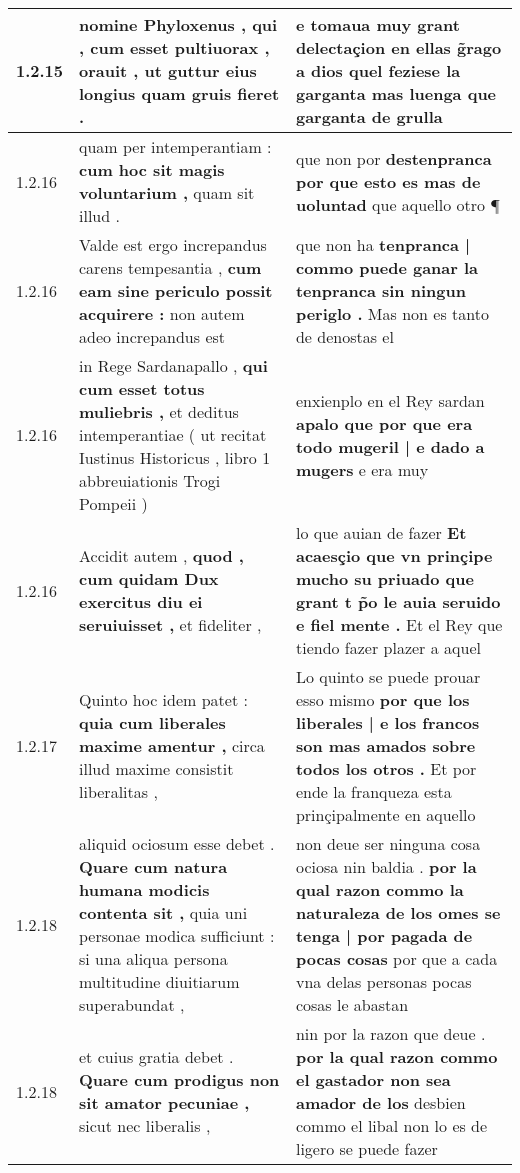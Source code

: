 \begin{tabular}{|p{1cm}|p{6.5cm}|p{6.5cm}|}
1.2.15 & nomine Phyloxenus , \textbf{ qui , cum esset pultiuorax , orauit , } ut guttur eius longius quam gruis fieret . & e tomaua muy grant delectaçion en ellas g̃rago a dios \textbf{ quel feziese la garganta } mas luenga que garganta de grulla \\\hline
1.2.16 & quam per intemperantiam : \textbf{ cum hoc sit magis voluntarium , } quam sit illud . & que non por \textbf{ destenpranca por que esto es mas de uoluntad } que aquello otro ¶ \\\hline
1.2.16 & Valde est ergo increpandus carens tempesantia , \textbf{ cum eam sine periculo possit acquirere : } non autem adeo increpandus est & que non ha \textbf{ tenpranca | commo puede ganar la tenpranca sin ningun periglo . } Mas non es tanto de denostas el \\\hline
1.2.16 & in Rege Sardanapallo , \textbf{ qui cum esset totus muliebris , } et deditus intemperantiae ( ut recitat Iustinus Historicus , libro 1 abbreuiationis Trogi Pompeii ) & enxienplo en el Rey sardan \textbf{ apalo que por que era todo mugeril | e dado a mugers } e era muy \\\hline
1.2.16 & Accidit autem , \textbf{ quod , cum quidam Dux exercitus diu ei seruiuisset , } et fideliter , & lo que auian de fazer \textbf{ Et acaesçio que vn prinçipe mucho su priuado que grant t p̃o le auia seruido e fiel mente . } Et el Rey que tiendo fazer plazer a aquel \\\hline
1.2.17 & Quinto hoc idem patet : \textbf{ quia cum liberales maxime amentur , } circa illud maxime consistit liberalitas , & Lo quinto se puede prouar esso mismo \textbf{ por que los liberales | e los francos son mas amados sobre todos los otros . } Et por ende la franqueza esta prinçipalmente en aquello \\\hline
1.2.18 & aliquid ociosum esse debet . \textbf{ Quare cum natura humana modicis contenta sit , } quia uni personae modica sufficiunt : si una aliqua persona multitudine diuitiarum superabundat , & non deue ser ninguna cosa ociosa nin baldia . \textbf{ por la qual razon commo la naturaleza de los omes se tenga | por pagada de pocas cosas } por que a cada vna delas personas pocas cosas le abastan \\\hline
1.2.18 & et cuius gratia debet . \textbf{ Quare cum prodigus non sit amator pecuniae , } sicut nec liberalis , & nin por la razon que deue . \textbf{ por la qual razon commo el gastador non sea amador de los } desbien commo el libal non lo es de ligero se puede fazer \\\hline

\end{tabular}
